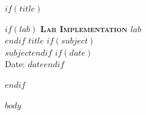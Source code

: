 \documentclass[11pt,a4paper]{article}
\begin{document}
$if(title)$
\begin{center}
$if(lab)$
{\small\bfseries\color{accent}\textsc{Lab Implementation $lab$}}\\[0.25em]
$endif$
{\LARGE\bfseries $title$}
$if(subject)$\\[0.35em]{\normalsize\itshape $subject$}$endif$
$if(date)$\\[0.2em]{\small Date: $date$}$endif$
\end{center}
\vspace{-0.4em}
$endif$

$body$
\end{document}
